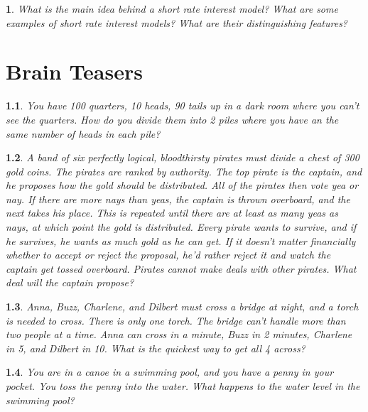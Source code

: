 \documentclass{report}
\newtheorem{problem}{}
\numberwithin{problem}{chapter} %
\begin{document}
\begin{problem}
What is the main idea behind a short rate interest model? What are some examples of short rate interest models? What are their distinguishing features?
\end{problem}


\chapter{Brain Teasers}

\begin{problem}
You have 100 quarters, 10 heads, 90 tails up in a dark room where you can't see the quarters. How do you divide them into 2 piles where you have an the same number of heads in each pile?
\end{problem}

\begin{problem}
A band of six perfectly logical, bloodthirsty pirates must divide a chest of 300 gold coins. The pirates are ranked by authority. The top pirate is the captain, and he proposes how the gold should be distributed. All of the pirates then vote yea or nay. If there are more nays than yeas, the captain is thrown overboard, and the next takes his place. This is repeated until there are at least as many yeas as nays, at which point the gold is distributed. Every pirate wants to survive, and if he survives, he wants as much gold as he can get. If it doesn't matter financially whether to accept or reject the proposal, he'd rather reject it and watch the captain get tossed overboard. Pirates cannot make deals with other pirates. What deal will the captain propose?
\end{problem}

\begin{problem}
Anna, Buzz, Charlene, and Dilbert must cross a bridge at night, and a torch is needed to cross. There is only one torch. The bridge can't handle more than two people at a time. Anna can cross in a minute, Buzz in 2 minutes, Charlene in 5, and Dilbert in 10. What is the quickest way to get all 4 across?
\end{problem}

\begin{problem}
You are in a canoe in a swimming pool, and you have a penny in your pocket. You toss the penny into the water. What happens to the water level in the swimming pool?
\end{problem}
\end{document}
